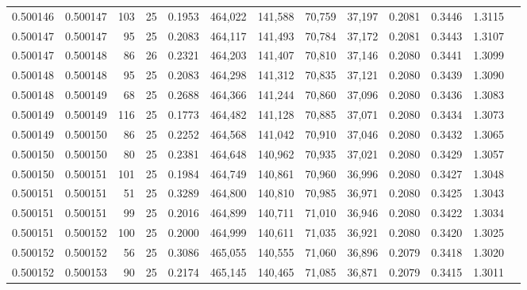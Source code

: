\begin{tabular}{rrrrrrrrrrrrr}
0.500146 & 0.500147 & 103 &  25 &                                     0.1953 & 464,022 & 141,588 &  70,759 &  37,197 & 0.2081 & 0.3446 & 1.3115 \\
0.500147 & 0.500147 &  95 &  25 &                                     0.2083 & 464,117 & 141,493 &  70,784 &  37,172 & 0.2081 & 0.3443 & 1.3107 \\
0.500147 & 0.500148 &  86 &  26 &                                     0.2321 & 464,203 & 141,407 &  70,810 &  37,146 & 0.2080 & 0.3441 & 1.3099 \\
0.500148 & 0.500148 &  95 &  25 &                                     0.2083 & 464,298 & 141,312 &  70,835 &  37,121 & 0.2080 & 0.3439 & 1.3090 \\
0.500148 & 0.500149 &  68 &  25 &                                     0.2688 & 464,366 & 141,244 &  70,860 &  37,096 & 0.2080 & 0.3436 & 1.3083 \\
0.500149 & 0.500149 & 116 &  25 &                                     0.1773 & 464,482 & 141,128 &  70,885 &  37,071 & 0.2080 & 0.3434 & 1.3073 \\
0.500149 & 0.500150 &  86 &  25 &                                     0.2252 & 464,568 & 141,042 &  70,910 &  37,046 & 0.2080 & 0.3432 & 1.3065 \\
0.500150 & 0.500150 &  80 &  25 &                                     0.2381 & 464,648 & 140,962 &  70,935 &  37,021 & 0.2080 & 0.3429 & 1.3057 \\
0.500150 & 0.500151 & 101 &  25 &                                     0.1984 & 464,749 & 140,861 &  70,960 &  36,996 & 0.2080 & 0.3427 & 1.3048 \\
0.500151 & 0.500151 &  51 &  25 &                                     0.3289 & 464,800 & 140,810 &  70,985 &  36,971 & 0.2080 & 0.3425 & 1.3043 \\
0.500151 & 0.500151 &  99 &  25 &                                     0.2016 & 464,899 & 140,711 &  71,010 &  36,946 & 0.2080 & 0.3422 & 1.3034 \\
0.500151 & 0.500152 & 100 &  25 &                                     0.2000 & 464,999 & 140,611 &  71,035 &  36,921 & 0.2080 & 0.3420 & 1.3025 \\
0.500152 & 0.500152 &  56 &  25 &                                     0.3086 & 465,055 & 140,555 &  71,060 &  36,896 & 0.2079 & 0.3418 & 1.3020 \\
0.500152 & 0.500153 &  90 &  25 &                                     0.2174 & 465,145 & 140,465 &  71,085 &  36,871 & 0.2079 & 0.3415 & 1.3011 \\

\end{tabular}
